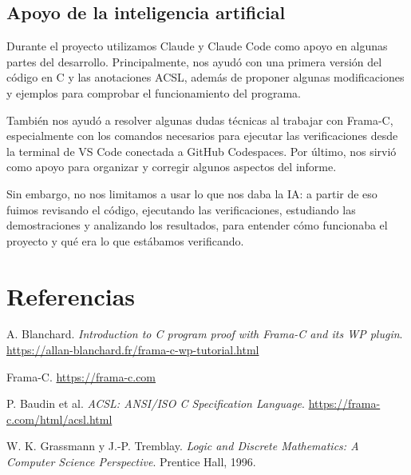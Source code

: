 \documentclass[11pt,letterpaper]{article}
\begin{document}
\subsection*{Apoyo de la inteligencia artificial}

Durante el proyecto utilizamos Claude y Claude Code como apoyo en algunas partes del desarrollo. Principalmente, nos ayudó con una primera versión del código en C y las anotaciones ACSL, además de proponer algunas modificaciones y ejemplos para comprobar el funcionamiento del programa.

También nos ayudó a resolver algunas dudas técnicas al trabajar con Frama-C, especialmente con los comandos necesarios para ejecutar las verificaciones desde la terminal de VS Code conectada a GitHub Codespaces. Por último, nos sirvió como apoyo para organizar y corregir algunos aspectos del informe.

Sin embargo, no nos limitamos a usar lo que nos daba la IA: a partir de eso fuimos revisando el código, ejecutando las verificaciones, estudiando las demostraciones y analizando los resultados, para entender cómo funcionaba el proyecto y qué era lo que estábamos verificando.

\section*{Referencias}
\begin{enumerate}[label={[\arabic*]}]
\item A. Blanchard. \emph{Introduction to C program proof with Frama-C and its WP plugin}. \url{https://allan-blanchard.fr/frama-c-wp-tutorial.html}
\item Frama-C. \url{https://frama-c.com}
\item P. Baudin et al. \emph{ACSL: ANSI/ISO C Specification Language}. \url{https://frama-c.com/html/acsl.html}
\item W. K. Grassmann y J.-P. Tremblay. \emph{Logic and Discrete Mathematics: A Computer Science Perspective}. Prentice Hall, 1996.
\end{enumerate}
\end{document}
